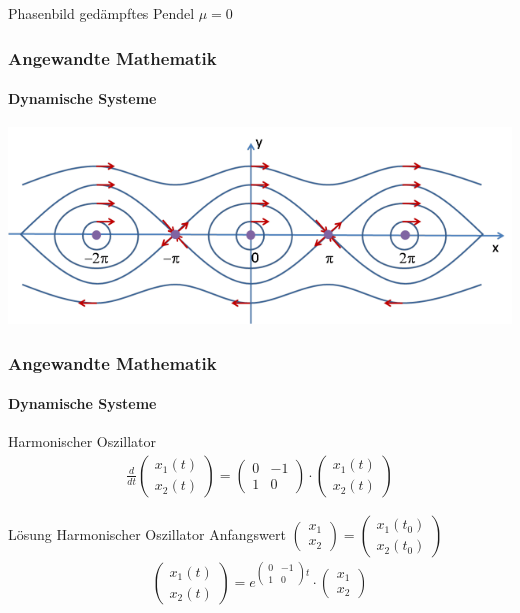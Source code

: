 \documentclass{beamer}
\begin{document}
 \begin{frame}
    \begin{block}{Phasenbild gedämpftes Pendel}
    $\mu = 0$
    \frametitle{Angewandte Mathematik}
\framesubtitle{Dynamische Systeme }
\includegraphics[scale=0.9]{images/pendulum1}
    \end{block}
\end{frame}

\begin{frame}
    \frametitle{Angewandte Mathematik}
\framesubtitle{Dynamische Systeme }
\begin{block}{Harmonischer Oszillator}
\begin{align*}
    \frac{d}{dt}\begin{pmatrix}
        x_1(t) \\ x_2(t)
    \end{pmatrix} = 
\begin{pmatrix}
    0 & -1  \\ 1 & 0
\end{pmatrix} \cdot
\begin{pmatrix} 
    x_1(t) \\ x_2(t)
\end{pmatrix} 
\end{align*}
\end{block}

\begin{block}{Lösung Harmonischer Oszillator}
    Anfangswert $\begin{pmatrix}
        x_1 \\ x_2\end{pmatrix} = \begin{pmatrix}
            x_1(t_0) \\ x_2(t_0)\end{pmatrix}$
    \begin{align*}
        \begin{pmatrix}
            x_1(t) \\ x_2(t)
        \end{pmatrix} = e^{ \begin{pmatrix}
            0 & -1  \\ 1 & 0
        \end{pmatrix} t } \cdot \begin{pmatrix}
            x_1\\ x_2
        \end{pmatrix}
    \end{align*}
\end{block}

 \end{frame}
\end{document}

